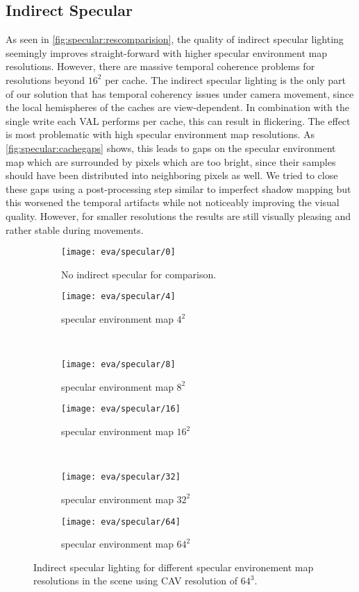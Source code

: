 \documentclass[thesis.tex]{subfiles}
\begin{document}
\subsection{Indirect Specular}\label{sec:eva:specquality}
As seen in \autoref{fig:specular:rescomparision}, the quality of indirect specular lighting seemingly improves straight-forward with higher specular environment map resolutions.
However, there are massive temporal coherence problems for resolutions beyond $16^2$ per cache.
The indirect specular lighting is the only part of our solution that has temporal coherency issues under camera movement, since the local hemispheres of the caches are view-dependent.
In combination with the single write each VAL performs per cache, this can result in flickering.
The effect is most problematic with high specular environment map resolutions.
As \autoref{fig:specular:cachegaps} shows, this leads to gaps on the specular environment map which are surrounded by pixels which are too bright, since their samples should have been distributed into neighboring pixels as well.
We tried to close these gaps using a post-processing step similar to imperfect shadow mapping \cite{bib:imperfectshadowmaps} but this worsened the temporal artifacts while not noticeably improving the visual quality.
However, for smaller resolutions the results are still visually pleasing and rather stable during movements.
%
\begin{figure}
\begin{subfigure}[b]{\halfpageimage}
\texttt{[image: eva/specular/0]}
\caption{No indirect specular for comparison.}
\end{subfigure}
\begin{subfigure}[b]{\halfpageimage}
\texttt{[image: eva/specular/4]}
\caption{specular environment map $4^2$}
\end{subfigure}
\\
\begin{subfigure}[b]{\halfpageimage}
\texttt{[image: eva/specular/8]}
\caption{specular environment map $8^2$}
\end{subfigure}
\begin{subfigure}[b]{\halfpageimage}
\texttt{[image: eva/specular/16]}
\caption{specular environment map $16^2$}
\end{subfigure}
\\
\begin{subfigure}[b]{\halfpageimage}
\texttt{[image: eva/specular/32]}
\caption{specular environment map $32^2$}
\end{subfigure}
\begin{subfigure}[b]{\halfpageimage}
\texttt{[image: eva/specular/64]}
\caption{specular environment map $64^2$}
\end{subfigure}
\caption{Indirect specular lighting for different specular environement map resolutions in the  scene using CAV resolution of $64^3$. }
\label{fig:specular:rescomparision}
\end{figure}
\end{document}
